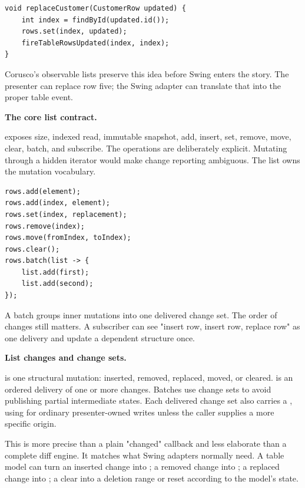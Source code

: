 \begin{lstlisting}[caption={A precise table-model update.}]
void replaceCustomer(CustomerRow updated) {
    int index = findById(updated.id());
    rows.set(index, updated);
    fireTableRowsUpdated(index, index);
}
\end{lstlisting}

Corusco's observable lists preserve this idea before Swing enters the story.
The presenter can replace row five; the Swing adapter can translate that into
the proper table event.

\textbf{The core list contract.}

 exposes size, indexed read, immutable snapshot, add,
insert, set, remove, move, clear, batch, and subscribe. The operations are
deliberately explicit. Mutating through a hidden iterator would make change
reporting ambiguous. The list owns the mutation vocabulary.

\begin{lstlisting}[caption={Core mutation vocabulary.}]
rows.add(element);
rows.add(index, element);
rows.set(index, replacement);
rows.remove(index);
rows.move(fromIndex, toIndex);
rows.clear();
rows.batch(list -> {
    list.add(first);
    list.add(second);
});
\end{lstlisting}

A batch groups inner mutations into one delivered change set. The order of
changes still matters. A subscriber can see "insert row, insert row, replace
row" as one delivery and update a dependent structure once.

\textbf{List changes and change sets.}

 is one structural mutation: inserted,
removed, replaced, moved, or cleared.  is
an ordered delivery of one or more changes. Batches use change sets to avoid
publishing partial intermediate states. Each delivered change set also carries a
, using  for ordinary
presenter-owned writes unless the caller supplies a more specific origin.

This is more precise than a plain "changed" callback and less elaborate than a
complete diff engine. It matches what Swing adapters normally need. A table
model can turn an inserted change into ; a removed
change into ; a replaced change into
; a clear into a deletion range or reset according to
the model's state.

